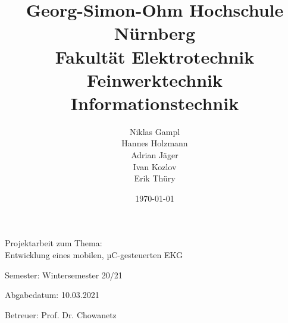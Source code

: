 
\title{Georg-Simon-Ohm Hochschule Nürnberg\\Fakultät Elektrotechnik Feinwerktechnik Informationstechnik}
\author{Niklas Gampl\\Hannes Holzmann\\Adrian Jäger\\Ivan Kozlov\\Erik Thüry}
\date{\today}
\maketitle

\noindent
\begin{center}
    \Large{Projektarbeit zum Thema:\\
    Entwicklung eines mobilen, µC-gesteuerten EKG}
\end{center}
\normalsize

\vfill

\noindent
Semester: Wintersemester 20/21

\noindent
Abgabedatum: 10.03.2021

\noindent
Betreuer: Prof. Dr. Chowanetz
